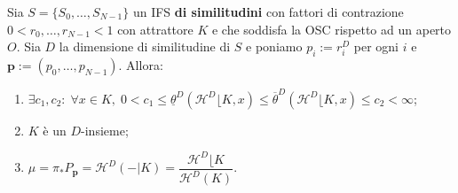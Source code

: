 \begin{teorema}
	Sia $S = \{S_{0},\dots,S_{N-1}\}$ un IFS \textbf{di similitudini} con fattori di contrazione $0<r_{0},\dots,r_{N-1}<1$ con attrattore $K$ e che soddisfa la OSC rispetto ad un aperto $O$. Sia $D$ la dimensione di similitudine di $S$ e poniamo $p_{i}:=r_{i}^{D}$ per ogni $i$ e $\mathbf p :=(p_{0},\dots,p_{N-1})$. Allora:
	\begin{enumerate}
		\item $\exists c_{1}, c_{2}:\; \forall x\in K,\; 0<c_{1}\leq\underline\theta^{D}(\mathcal H^{D}\lfloor K, x)\leq\overline\theta^{D}(\mathcal H^{D}\lfloor K, x)\leq c_{2}<\infty$;
		\item $K$ è un $D$-insieme;
		\item $\mu = \pi_{*}P_{\mathbf p} = \mathcal H^{D}(-|K) = \dfrac{\mathcal H^{D}\lfloor K}{\mathcal H^{D}(K)}$.
	\end{enumerate}
\end{teorema}
